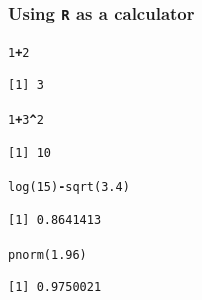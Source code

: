 \documentclass[handout]{beamer}\usepackage[]{graphicx}\usepackage[]{color}
\makeatletter
\newcommand{\hlnum}[1]{\textcolor[rgb]{0.533,0,0.133}{#1}}%
\newcommand{\hlopt}[1]{\textcolor[rgb]{0,0,0}{\textbf{#1}}}%
\newcommand{\hlstd}[1]{\textcolor[rgb]{0,0,0}{#1}}%
\newcommand{\hlkwd}[1]{\textcolor[rgb]{0,0.267,0.4}{#1}}%
\newenvironment{kframe}{%
 \def\at@end@of@kframe{}%
 \ifinner\ifhmode%
  \def\at@end@of@kframe{\end{minipage}}%
  \begin{minipage}{\columnwidth}%
 \fi\fi%
 \def\FrameCommand##1{\hskip\@totalleftmargin \hskip-\fboxsep
 \colorbox{shadecolor}{##1}\hskip-\fboxsep
     \hskip-\linewidth \hskip-\@totalleftmargin \hskip\columnwidth}%
 \MakeFramed {\advance\hsize-\width
   \@totalleftmargin\z@ \linewidth\hsize
   \@setminipage}}%
 {\par\unskip\endMakeFramed%
 \at@end@of@kframe}
\newenvironment{knitrout}{}{} %
\makeatother
\begin{document}
\begin{frame}[fragile]
  \frametitle{Using \texttt{R} as a calculator}
\begin{knitrout}
\color{fgcolor}\begin{kframe}
\begin{alltt}
\hlnum{1}\hlopt{+}\hlnum{2}
\end{alltt}
\begin{verbatim}
[1] 3
\end{verbatim}
\end{kframe}
\end{knitrout}
\begin{knitrout}
\color{fgcolor}\begin{kframe}
\begin{alltt}
\hlnum{1} \hlopt{+} \hlnum{3}\hlopt{^}\hlnum{2}
\end{alltt}
\begin{verbatim}
[1] 10
\end{verbatim}
\end{kframe}
\end{knitrout}
\begin{knitrout}
\color{fgcolor}\begin{kframe}
\begin{alltt}
\hlkwd{log}\hlstd{(}\hlnum{15}\hlstd{)} \hlopt{-} \hlkwd{sqrt}\hlstd{(}\hlnum{3.4}\hlstd{)}
\end{alltt}
\begin{verbatim}
[1] 0.8641413
\end{verbatim}
\end{kframe}
\end{knitrout}
\begin{knitrout}
\color{fgcolor}\begin{kframe}
\begin{alltt}
\hlkwd{pnorm}\hlstd{(}\hlnum{1.96}\hlstd{)}
\end{alltt}
\begin{verbatim}
[1] 0.9750021
\end{verbatim}
\end{kframe}
\end{knitrout}
\end{frame}
\end{document}
